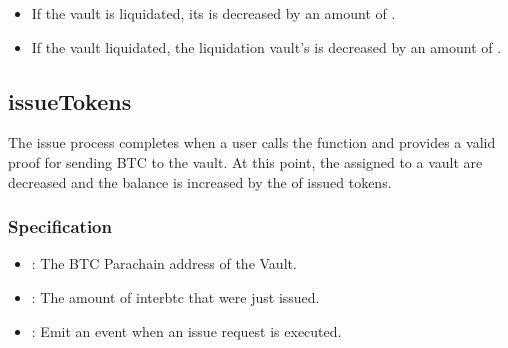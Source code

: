 \documentclass[a4paper,10pt,english]{sphinxmanual}
\begin{document}
\begin{itemize}
\item {} 
If the vault is  liquidated, its  is decreased by an amount of .

\item {} 
If the vault  liquidated, the liquidation vault’s  is decreased by an amount of .

\end{itemize}


\subsection{issueTokens}
\label{\detokenize{spec/vault-registry:issuetokens}}\label{\detokenize{spec/vault-registry:id17}}
The issue process completes when a user calls the {\hyperref[\detokenize{spec/issue:executeissue}]{}} function and provides a valid proof for sending BTC to the vault. At this point, the  assigned to a vault are decreased and the  balance is increased by the  of issued tokens.


\subsubsection{Specification}
\label{\detokenize{spec/vault-registry:id18}}


\begin{itemize}
\item {} 
: The BTC Parachain address of the Vault.

\item {} 
: The amount of interbtc that were just issued.

\end{itemize}

\begin{itemize}
\item {} 
: Emit an event when an issue request is executed.

\end{itemize}
\end{document}
